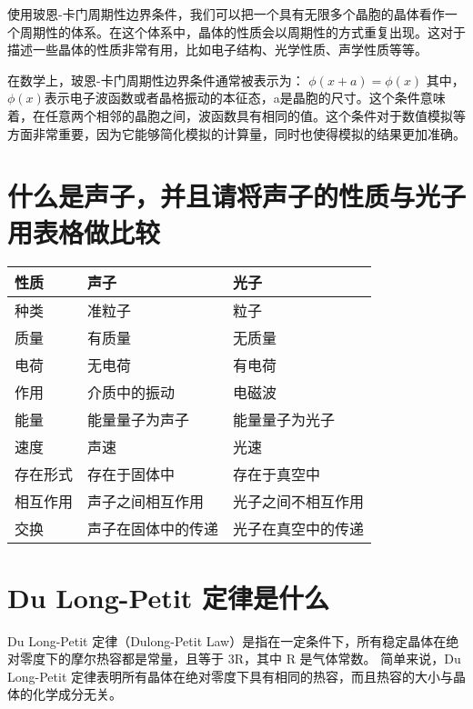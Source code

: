 \documentclass[12pt, a4paper, oneside]{ctexart}
\begin{document}
\begin{spacing}{2.0}
使用玻恩-卡门周期性边界条件，我们可以把一个具有无限多个晶胞的晶体看作一个周期性的体系。在这个体系中，晶体的性质会以周期性的方式重复出现。这对于描述一些晶体的性质非常有用，比如电子结构、光学性质、声学性质等等。

在数学上，玻恩-卡门周期性边界条件通常被表示为：
$\phi(x+a) = \phi(x)$
其中，$\phi(x)$表示电子波函数或者晶格振动的本征态，a是晶胞的尺寸。这个条件意味着，在任意两个相邻的晶胞之间，波函数具有相同的值。这个条件对于数值模拟等方面非常重要，因为它能够简化模拟的计算量，同时也使得模拟的结果更加准确。




\section{什么是声子，并且请将声子的性质与光子用表格做比较}


\begin{center}
    \begin{table}[H]
        \centering
        \begin{tabular}{|l|l|l|} 
        \hline
        性质 & 声子 & 光子 \\ 
        \hline
        种类 & 准粒子 & 粒子\\ 
        \hline
        质量 & 有质量 & 无质量  \\ 
        \hline
        电荷 & 无电荷 & 有电荷 \\ 
        \hline
        作用 & 介质中的振动 & 电磁波\\ 
        \hline
        能量 & 能量量子为声子 & 能量量子为光子 \\ 
        \hline
        速度 & 声速 & 光速\\ 
        \hline
        存在形式 & 存在于固体中 & 存在于真空中 \\ 
        \hline
        相互作用 & 声子之间相互作用 & 光子之间不相互作用\\ 
        \hline
        交换 & 声子在固体中的传递 & 光子在真空中的传递\\
        \hline
        \end{tabular}
        \end{table}
\end{center}
\section{Du Long-Petit 定律是什么}
Du Long-Petit 定律（Dulong-Petit Law）是指在一定条件下，所有稳定晶体在绝对零度下的摩尔热容都是常量，且等于 3R，其中 R 是气体常数。
简单来说，Du Long-Petit 定律表明所有晶体在绝对零度下具有相同的热容，而且热容的大小与晶体的化学成分无关。


\end{spacing}
\end{document}
